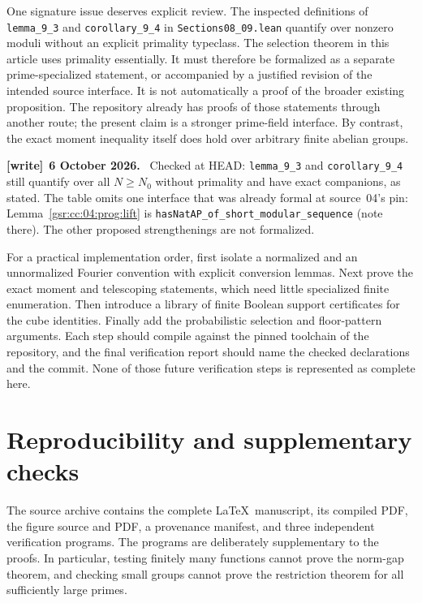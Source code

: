 \documentclass[11pt,letterpaper]{article}
\numberwithin{equation}{section}
\theoremstyle{definition}
\theoremstyle{remark}
\newcommand{\1}{\mathbf 1}
\newcommand{\file}[1]{\nolinkurl{#1}}
\newenvironment{writenote}[1][]{\par\smallskip\begingroup\small
 \noindent\textbf{[write]}\if\relax\detokenize{#1}\relax\else~\textbf{#1.}\fi\ }%
 {\par\endgroup\smallskip}
\newcommand{\srctag}[1]{\texorpdfstring{\enspace\textup{[#1]}}{ [#1]}}
\newcommand{\srcnote}[2]{\par\noindent{\small\textit{Source #1, delivered #2.}}\par}
\begin{document}
One signature issue deserves explicit review.  The inspected definitions
of \texttt{lemma\_9\_3} and \texttt{corollary\_9\_4} in
\texttt{Sections08\_09.lean} quantify over nonzero moduli without an
explicit primality typeclass.  The selection theorem in this article
uses primality essentially.  It must therefore be formalized as a
separate prime-specialized statement, or accompanied by a justified
revision of the intended source interface.  It is not automatically a
proof of the broader existing proposition.  The repository already has
proofs of those statements through another route; the present claim is
a stronger prime-field interface.  By contrast, the exact
moment inequality itself does hold over arbitrary finite abelian groups.
\begin{writenote}[6 October 2026]
Checked at HEAD: \file{lemma_9_3} and \file{corollary_9_4} still quantify over all $N\ge N_0$ without primality and have exact companions, as stated. The table omits one interface that was already formal at source~04's pin: Lemma~\ref{gsr:cc:04:prog:lift} is \file{hasNatAP_of_short_modular_sequence} (note there). The other proposed strengthenings are not formalized.
\end{writenote}

For a practical implementation order, first isolate a normalized and an
unnormalized Fourier convention with explicit conversion lemmas.  Next
prove the exact moment and telescoping statements, which need little
specialized finite enumeration.  Then introduce a library of finite
Boolean support certificates for the cube identities.  Finally add the
probabilistic selection and floor-pattern arguments.  Each step should
compile against the pinned toolchain of the repository, and the final
verification report should name the checked declarations and the commit.
None of those future verification steps is represented as complete here.

\section[{Reproducibility and supplementary checks\srctag{04}}]{Reproducibility and supplementary checks}\label{gsr:fz:04:sec:dB}
\srcnote{04}{Appendix B}
\label{gsr:fz:04:app:checks}

The source archive contains the complete \LaTeX\ manuscript, its compiled
PDF, the figure source and PDF, a provenance manifest, and three independent
verification programs.  The programs are deliberately supplementary to
the proofs.  In particular, testing finitely many functions cannot prove
the norm-gap theorem, and checking small groups cannot prove the
restriction theorem for all sufficiently large primes.
\end{document}
